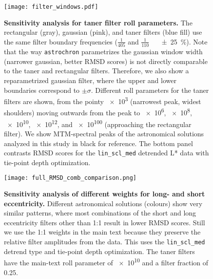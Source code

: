 \documentclass[draft]{agujournal2019}
\begin{document}
\begin{figure}[htb]
  \centering \texttt{[image: filter\_windows.pdf]}
  \caption{\label{fig:filter-windows}
    \textbf{Sensitivity analysis for taner filter roll parameters.}
    The rectangular (gray), gaussian (pink), and taner filters (blue fill)
    use the same filter boundary frequencies (\(\frac{1}{405}\) and \(\frac{1}{110}\)~\si[per-mode=power]{\per\kiloyear} \qty{\pm25}{\percent}).
    Note that the way \texttt{astrochron} parametrizes the gaussian window width (narrower gaussian, better RMSD scores) is not directly comparable to the taner and rectangular filters.
    Therefore, we also show a reparametrized gaussian filter, where the upper and lower boundaries correspond to \(\pm\sigma\).
    Different roll parameters for the taner filters are shown,
    from the pointy \num{e3} (narrowest peak, widest shoulders) moving outwards from the peak to
    \num{e6}, \num{e8}, \num{e10}, \num{e12}, and \num{e100} (approaching the rectangular filter).
    We show MTM-spectral peaks of the astronomical solutions analyzed in this study in black for reference.
    The bottom panel contrasts \gls{RMSD} scores for the \texttt{lin\_scl\_med} detrended \gls{L*} data with tie-point depth optimization.
    }
\end{figure}


\begin{figure}[htb]
  \centering \texttt{[image: full\_RMSD\_comb\_comparison.png]}
  \caption{\label{fig:full-RMSD-comb}
    \textbf{Sensitivity analysis of different weights for long- and short eccentricity.}
    Different astronomical solutions (colours) show very similar patterns,
    where most combinations of the short and long eccentricity filters other than 1:1 result in lower \gls{RMSD} scores.
    Still we use the 1:1 weights in the main text because they preserve the relative filter amplitudes from the data.
    This uses the \texttt{lin\_scl\_med} detrend type and tie-point depth optimization.
    The taner filters have the main-text roll parameter of \num{e10} and a filter fraction of \num{0.25}.
    }
\end{figure}


\end{document}
